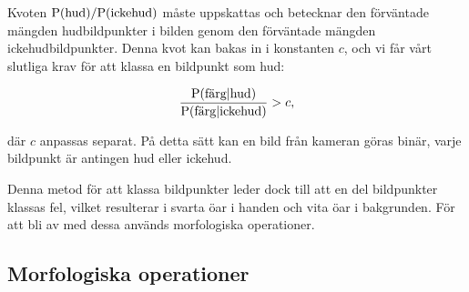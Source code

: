 \documentclass[../rapport_MVEX01-11-05]{subfiles}
\begin{document}
Kvoten $\mathrm{P}(\textrm{hud})/\mathrm{P}(\textrm{ickehud})$ måste uppskattas och betecknar
den förväntade mängden hudbildpunkter i bilden genom den förväntade mängden
ickehudbildpunkter. Denna kvot kan bakas in i konstanten $c$, och vi
får vårt slutliga krav för att klassa en bildpunkt som hud:

\begin{equation*}
	\frac{\mathrm{P}(\textrm{färg}|\textrm{hud})}{\mathrm{P}(\textrm{färg}|\textrm{ickehud})} > c,
\end{equation*}

där $c$ anpassas separat. På detta sätt kan en bild från kameran göras
binär, varje bildpunkt är antingen hud eller ickehud.

Denna metod för att klassa bildpunkter leder dock till att en del
bildpunkter klassas fel, vilket resulterar i svarta öar i handen
och vita öar i bakgrunden. För att bli av med dessa används
morfologiska operationer.

\subsection{Morfologiska operationer}\label{sec:morph}
\end{document}
